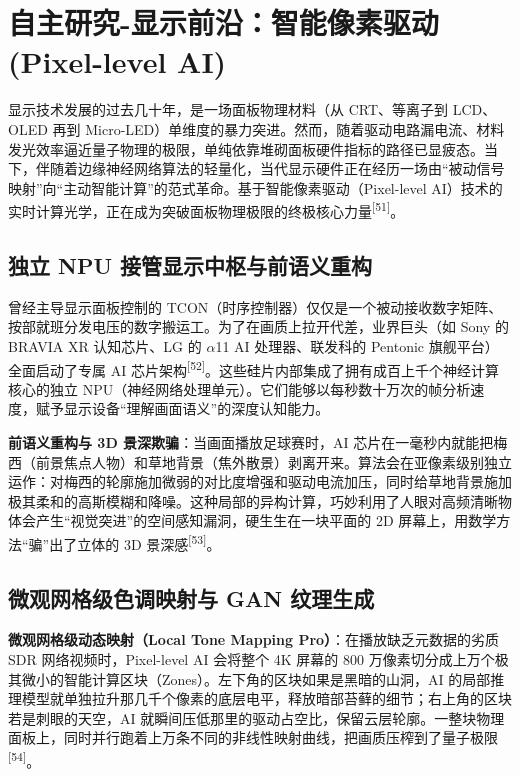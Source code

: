\documentclass[12pt, a4paper]{ctexart}
\newcommand{\scite}[1]{\textsuperscript{[#1]}}
\begin{document}
\newpage
\section{自主研究-显示前沿：智能像素驱动 (Pixel-level AI)}

显示技术发展的过去几十年，是一场面板物理材料（从 CRT、等离子到 LCD、OLED 再到 Micro-LED）单维度的暴力突进。然而，随着驱动电路漏电流、材料发光效率逼近量子物理的极限，单纯依靠堆砌面板硬件指标的路径已显疲态。当下，伴随着边缘神经网络算法的轻量化，当代显示硬件正在经历一场由“被动信号映射”向“主动智能计算”的范式革命。基于智能像素驱动（Pixel-level AI）技术的实时计算光学，正在成为突破面板物理极限的终极核心力量\scite{51}。

\subsection{独立 NPU 接管显示中枢与前语义重构}

曾经主导显示面板控制的 TCON（时序控制器）仅仅是一个被动接收数字矩阵、按部就班分发电压的数字搬运工。为了在画质上拉开代差，业界巨头（如 Sony 的 BRAVIA XR 认知芯片、LG 的 $\alpha$11 AI 处理器、联发科的 Pentonic 旗舰平台）全面启动了专属 AI 芯片架构\scite{52}。这些硅片内部集成了拥有成百上千个神经计算核心的独立 NPU（神经网络处理单元）。它们能够以每秒数十万次的帧分析速度，赋予显示设备“理解画面语义”的深度认知能力。

\textbf{前语义重构与 3D 景深欺骗}：当画面播放足球赛时，AI 芯片在一毫秒内就能把梅西（前景焦点人物）和草地背景（焦外散景）剥离开来。算法会在亚像素级别独立运作：对梅西的轮廓施加微弱的对比度增强和驱动电流加压，同时给草地背景施加极其柔和的高斯模糊和降噪。这种局部的异构计算，巧妙利用了人眼对高频清晰物体会产生“视觉突进”的空间感知漏洞，硬生生在一块平面的 2D 屏幕上，用数学方法“骗”出了立体的 3D 景深感\scite{53}。

\subsection{微观网格级色调映射与 GAN 纹理生成}

\textbf{微观网格级动态映射（Local Tone Mapping Pro）}：在播放缺乏元数据的劣质 SDR 网络视频时，Pixel-level AI 会将整个 4K 屏幕的 800 万像素切分成上万个极其微小的智能计算区块（Zones）。左下角的区块如果是黑暗的山洞，AI 的局部推理模型就单独拉升那几千个像素的底层电平，释放暗部苔藓的细节；右上角的区块若是刺眼的天空，AI 就瞬间压低那里的驱动占空比，保留云层轮廓。一整块物理面板上，同时并行跑着上万条不同的非线性映射曲线，把画质压榨到了量子极限\scite{54}。
\end{document}
